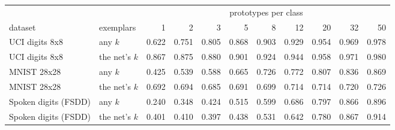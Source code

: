 \begin{tabular}{llrrrrrrrrr}
\toprule
& & \multicolumn{9}{c}{prototypes per class} \\
\cmidrule(lr){3-11}
dataset & exemplars & 1 & 2 & 3 & 5 & 8 & 12 & 20 & 32 & 50 \\
\midrule
UCI digits 8x8 & any $k$ & 0.622 & 0.751 & 0.805 & 0.868 & 0.903 & 0.929 & 0.954 & 0.969 & 0.978 \\
UCI digits 8x8 & the net's $k$ & 0.867 & 0.875 & 0.880 & 0.901 & 0.924 & 0.944 & 0.958 & 0.971 & 0.980 \\
\midrule
MNIST 28x28 & any $k$ & 0.425 & 0.539 & 0.588 & 0.665 & 0.726 & 0.772 & 0.807 & 0.836 & 0.869 \\
MNIST 28x28 & the net's $k$ & 0.692 & 0.694 & 0.685 & 0.691 & 0.699 & 0.714 & 0.714 & 0.720 & 0.726 \\
\midrule
Spoken digits (FSDD) & any $k$ & 0.240 & 0.348 & 0.424 & 0.515 & 0.599 & 0.686 & 0.797 & 0.866 & 0.896 \\
Spoken digits (FSDD) & the net's $k$ & 0.401 & 0.410 & 0.397 & 0.438 & 0.531 & 0.642 & 0.780 & 0.867 & 0.914 \\
\bottomrule
\end{tabular}
